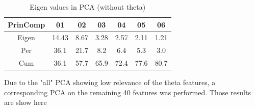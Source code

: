 \begin{table}[h!]
	\centering
	\begin{tabular}{|c|c|c|c|c|c|c|}
		\hline
		\textbf{PrinComp} & \textbf{01} & \textbf{02} & \textbf{03} & \textbf{04} & \textbf{05} & \textbf{06} \\
		\hline
		Eigen & 14.43 & 8.67 & 3.28 & 2.57 & 2.11 & 1.21 \\
		Per & 36.1 & 21.7 & 8.2 & 6.4 & 5.3 & 3.0 \\
		Cum & 36.1 & 57.7 & 65.9 & 72.4 & 77.6 & 80.7 \\
		\hline
	\end{tabular}
	\caption{Eigen values in PCA (without theta)}
	{\small Due to the "all" PCA showing low relevance of the theta features, a corresponding PCA on the remaining 40 features was performed. Those results are show here}
	\label{tab:eigen-values-without-theta}
\end{table}
\fi

